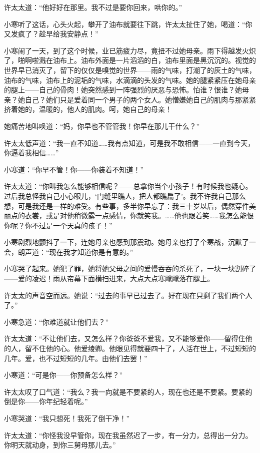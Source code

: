 \par 许太太道：“他好好在那里。我不过是要你回来，哄你的。”
\par 小寒听了这话，心头火起，攀开了油布就要往下跳，许太太扯住了她，喝道：“你又发疯了？趁早给我安静点！”
\par 小寒闹了一天，到了这个时候，业已筋疲力尽，竟扭不过她母亲。雨下得越发火炽了，啪啊啦溅在油布上。油布外面是一片滔滔的白，油布里面是黑沉沉的。视觉的世界早已消灭了，留下的仅仅是嗅觉的世界——雨的气味，打潮了的灰土的气味，油布的气味，油布上的泥垢的气味，水滴滴的头发的气味。她的腿紧紧压在她母亲的腿上——自己的骨肉！她突然感到一阵强烈的厌恶与恐怖。怕谁？恨谁？她母亲？她自己？她们只是爱着同一个男子的两个女人。她憎嫌她自己的肌肉与那紧紧挤着她的，温暖的，他人的肌肉。呵，她自己的母亲！
\par 她痛苦地叫唤道：“妈，你早也不管管我！你早在那儿干什么？”
\par 许太太低声道：“我一直不知道……我有点知道，可是我不敢相信——一直到今天，你逼着我相信……”
\par 小寒道：“你早不管！你——你装着不知道！”
\par 许太太道：“你叫我怎么能够相信呢？——总拿你当个小孩子！有时候我也疑心。过后我总怪我自己小心眼儿，‘门缝里瞧人，把人都瞧扁了’。我不许我自己那么想，可是我还是一样的难受。有些事，多半你早忘了：我三十岁以后，偶然穿件美丽点的衣裳，或是对他稍微露一点感情，你就笑我。……他也跟着笑……我怎么能恨你呢？你不过是一个天真的孩子！”
\par 小寒剧烈地颤抖了一下，连她母亲也感到那震动。她母亲也打了个寒战，沉默了一会，朗声道：“现在我才知道你是有意的。”
\par 小寒哭了起来。她犯了罪，她将她父母之间的爱慢吞吞的杀死了，一块一块割碎了——爱的凌迟！雨从帘幕下面横扫进来，大点大点寒飕飕落在腿上。
\par 许太太的声音空而远。她说：“过去的事早已过去了。好在现在只剩了我们两个人了。”
\par 小寒急道：“你难道就让他们去？”
\par 许太太道：“不让他们去，又怎么样？你爸爸不爱我，又不能够爱你——留得住他的人，留不住他的心。他爱绫卿。他眼见得就要四十了，人活在世上，不过短短的几年。爱，也不过短短的几年。由他们去罢！”
\par 小寒道：“可是你——你预备怎么样？”
\par 许太太叹了口气道：“我么？我一向就是不要紧的人，现在也还是不要紧。要紧的倒是你——你年纪轻着呢。”
\par 小寒哭道：“我只想死！我死了倒干净！”
\par 许太太道：“你怪我没早管你，现在我虽然迟了一步，有一分力，总得出一分力。你明天就动身，到你三舅母那儿去。”
